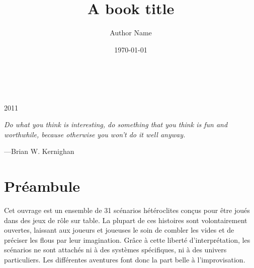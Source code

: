 \documentclass[a5paper,pagesize,10pt,bibliography=totoc,numbers=noenddot,
headings=normal,DIV=9,twoside=false]{scrbook}
\title{A book title}
\author{Author Name}
\date{\today}
\begin{document}
\begin{titlepage}
		\\
			
		\vspace{10mm}
		\\
		\vspace{\fill}
		\centering \large{2011}
\end{titlepage}


\newpage{}
\thispagestyle {empty}

\vspace*{2cm}

\begin{center}
	\Large{\parbox{10cm}{
		\begin{raggedright}
		{\Large 
			\textit{Do what you think is interesting, 
			do something that you think is fun and worthwhile, 
			because otherwise you won’t do it well anyway.}
		}
	
		\vspace{.5cm}\hfill{---Brian W. Kernighan}
		\end{raggedright}
	}
}
\end{center}

\newcommand\keywords[3]{%
	\section*{Mots-clés :}

	\textbf{Cadre} : #1

	\textbf{Genre} : #2

	\textbf{Thème} : #3
}%

\newcommand\medfan[1]{%
	\emph{medfan}
}%

\newpage


\chapter*{Préambule}

Cet ouvrage est un ensemble de 31 scénarios hétéroclites conçus pour être joués dans des jeux de rôle sur table.
La plupart de ces histoires sont volontairement ouvertes, laissant aux joueurs et joueuses le soin de combler les vides et de préciser les flous par leur imagination.
Grâce à cette liberté d'interprétation, les scénarios ne sont attachés ni à des systèmes spécifiques, ni à des univers particuliers.
Les différentes aventures font donc la part belle à l'improvisation.
\end{document}
